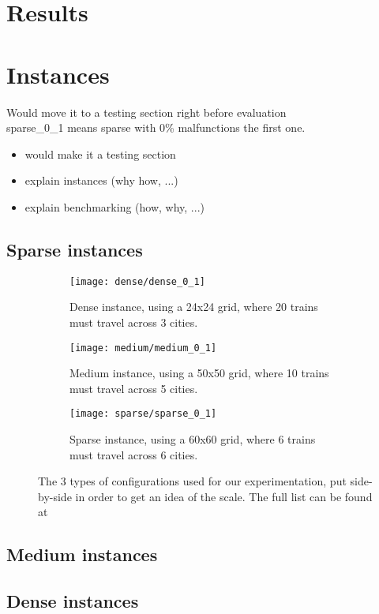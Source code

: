 \section{Results}
\section{Instances}
\color{green} Would move it to a testing section right before evaluation \color{black}\\
sparse\_0\_1 means sparse with 0\% malfunctions the first one.
\color{blue}
\begin{itemize}
	\item would make it a testing section
	\item explain instances (why how, ...)
	\item explain benchmarking (how, why, ...)
\end{itemize}
\color{black}

\subsection{Sparse instances}

\begin{figure}	
	\begin{minipage}{.41\textwidth}
		\begin{subfigure}{\textwidth}
			\centering
			\texttt{[image: dense/dense\_0\_1]}
			\caption{Dense instance, using a 24x24 grid, where 20 trains must travel across 3 cities.}
			\label{dense_0_1}
		\end{subfigure}
	\hfill
		\begin{subfigure}{\textwidth}
			\centering
			\texttt{[image: medium/medium\_0\_1]}
			\caption{Medium instance, using a 50x50 grid, where 10 trains must travel across 5 cities.}
			\label{medium_0_1}
		\end{subfigure}
	\end{minipage}
	\hfill
	\begin{minipage}{.49\textwidth}
				\begin{subfigure}{\textwidth}
		\centering
		\texttt{[image: sparse/sparse\_0\_1]}
		\caption{Sparse instance, using a 60x60 grid, where 6 trains must travel across 6 cities.}
		\label{sparse_0_1}
				\end{subfigure}
	\end{minipage}
	\caption{The 3 types of configurations used for our experimentation, put side-by-side in order to get an idea of the scale. The full list can be found at \cite{instance_folder}}
	\label{sparse_medium_dense}
\end{figure}

\subsection{Medium instances}

\subsection{Dense instances}